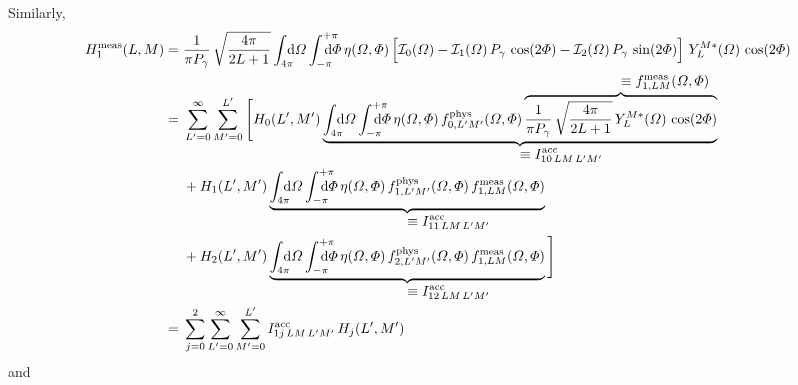 Similarly,
\begin{align}
  H_1^\text{meas}(L, M)
  ={}& \frac{1}{\pi P_\gamma}\, \sqrt{\frac{4 \pi}{2 L + 1}} \int_{4 \pi}\!\!\!\! \dif{\Omega} \int_{-\pi}^{+\pi}\hspace{-1.2em} \dif{\Phi}\,
  \eta(\Omega, \Phi) \sBrk[2]{\mathcal{I}_0(\Omega)
  - \mathcal{I}_1(\Omega)\, P_\gamma\, \cos(2 \Phi)
  - \mathcal{I}_2(\Omega)\, P_\gamma\, \sin(2 \Phi)}\,
  Y_L^{M *}(\Omega)\, \cos(2 \Phi) \notag
  \\
  ={}& \sum_{L' = 0}^\infty \sum_{M' = 0}^{L'} \Bigg[
  H_0(L', M')\,
  \rdUnderbrace{\int_{4 \pi}\!\!\!\! \dif{\Omega} \int_{-\pi}^{+\pi}\hspace{-1.2em} \dif{\Phi}\,
  \eta(\Omega, \Phi)\,
  f_{0, L' M'}^\text{phys}(\Omega, \Phi)\,
  \rdOverbrace{\frac{1}{\pi P_\gamma}\, \sqrt{\frac{4 \pi}{2 L + 1}}\, Y_L^{M *}(\Omega)\, \cos(2 \Phi)}{\equiv f_{1, L M}^\text{meas}(\Omega, \Phi)}}%
  {\equiv I^\text{acc}_{1 0\, L M\, L' M'}} \notag
  \\
  & + H_1(L', M')\,
  \rdUnderbrace{\int_{4 \pi}\!\!\!\! \dif{\Omega} \int_{-\pi}^{+\pi}\hspace{-1.2em} \dif{\Phi}\,
  \eta(\Omega, \Phi)\,
  f_{1, L' M'}^\text{phys}(\Omega, \Phi)\,
  f_{1, L M}^\text{meas}(\Omega, \Phi)}%
  {\equiv I^\text{acc}_{1 1\, L M\, L' M'}} \notag
  \\
  & + H_2(L', M')\,
  \rdUnderbrace{\int_{4 \pi}\!\!\!\! \dif{\Omega} \int_{-\pi}^{+\pi}\hspace{-1.2em} \dif{\Phi}\,
  \eta(\Omega, \Phi)\,
  f_{2, L' M'}^\text{phys}(\Omega, \Phi)\,
  f_{1, L M}^\text{meas}(\Omega, \Phi)}%
  {\equiv I^\text{acc}_{1 2\, L M\, L' M'}}\, \Bigg] \notag
  \\
  \label{eq:photoprod_moment_1_meas2}
  ={}& \sum_{j = 0}^2 \sum_{L' = 0}^\infty \sum_{M' = 0}^{L'}
  I^\text{acc}_{1 j\, L M\, L' M'}\, H_j(L', M')
\end{align}
and
